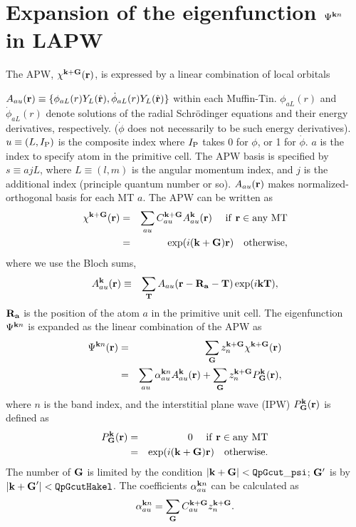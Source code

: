 \documentclass[a4paper,10pt,epsf,fleqn]{article}
\begin{document}
{%
\section{Expansion of the eigenfunction $\Psi^{{\bf k}n}$ in LAPW}
The APW, $\chi^{{\bf k+G}}({\bf r})$, is 
expressed by a linear combination of local orbitals

\noindent $A_{au}({\bf r})\equiv \{ \phi_{aL}(r) Y_L(\hat{\bf r}),\dot{\phi}_{aL}(r) Y_L(\hat{\bf r}) \}$
within each Muffin-Tin.
$\phi_{aL}(r)$ and $\dot{\phi}_{aL}(r)$ denote solutions of
the radial Schr\"odinger equations and their energy derivatives, respectively.
($\dot{\phi}$ does not necessarily to be such energy derivatives).
$u \equiv(L, I_{\rm P})$ is the composite index
where $I_{\rm P}$ takes 0 for $\phi$, or 1 for $\dot{\phi}$.
$a$ is the index to specify atom in the primitive cell.
The APW basis is specified by $s \equiv {ajL}$, where
$L\equiv(l,m)$ is the angular momentum index, and $j$ is the additional
index (principle quantum number or so). 
$A_{au}({\bf r})$ makes normalized-orthogonal basis for each MT $a$.
The APW can be written as
\begin{eqnarray}
\label{coeff}
\chi^{\bf k+G}({\bf r}) &=& \sum_{a u} C^{\bf k+G}_{a u} A^{\bf k}_{a u}({\bf r})   \ \ \ {\rm \ if \ {\bf r} \in any \ MT} \nonumber \\
        &=&   \exp(i ({\bf k+G}){\bf r}) \ \ \ {\rm otherwise},
\end{eqnarray}
where we use the Bloch sums,
\begin{eqnarray}
A^{\bf k}_{a u}({\bf r}) &\equiv& \sum_{\bf T} A_{a u}({\bf r-R_a-T}) \exp(i {\bf kT}),
\end{eqnarray}
${\bf R_a}$ is the position of the atom $a$ in the primitive unit cell.
The eigenfunction $\Psi^{{\bf k}n}$ is expanded as the linear combination of the APW as
\begin{eqnarray}
\label{eigenfunction}
\Psi^{{\bf k}n}({\bf r}) &=& \sum_{\bf G} z^{\bf k+G}_n \chi^{\bf k+G}({\bf r}) \\
&=& \sum_{a u} \alpha^{{\bf k}n}_{au} A^{\bf k}_{a u}({\bf r})
  + \sum_{\bf G} z^{\bf k+G}_n P^{\bf k}_{\bf G}({\bf r}),
\end{eqnarray}
where $n$ is the band index, 
and the interstitial plane wave (IPW) $P^{\bf k}_{\bf G}({\bf r})$ 
is defined as
\begin{eqnarray}
P^{\bf k}_{\bf G}({\bf r}) &=& 0  \ \ \ {\rm \ if \ {\bf r} \in any \ MT} \nonumber \\
        &=&   \exp (i ({\bf k+G}) {\bf r}) \ \ \ {\rm otherwise}.
\end{eqnarray}
The number of ${\bf G}$ is limited by the condition
$|{\bf k+G}|< {\tt QpGcut\_psi}$;
${\bf G}'$ is by $|{\bf k+G}'|< {\tt  QpGcutHakel}$.
The coefficients $\alpha^{{\bf k}n}_{au}$ can be calculated as
\begin{eqnarray}
\alpha^{{\bf k}n}_{au} = \sum_{\bf G} C^{{\bf k+G}}_{a u} z^{\bf k+G}_n.
\end{eqnarray}


}
\end{document}
